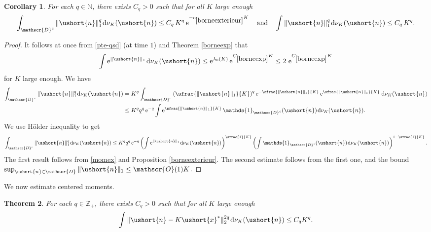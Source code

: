 \documentclass[JEP,XML,SOM,Unicode]{cedram}
\newcommand{\scaleto}[2]{#1}
\let\mathcal\mathscr
\numberwithin{equation}{section}
\theoremstyle{plain}
\newtheorem{theorem}{Theorem}[section]
\newtheorem{corollary}[theorem]{Corollary}
\theoremstyle{definition}
\newcommand{\cte}[1]{C_{\eqref{#1}}}
\newcommand{\pcte}[1]{c_{\eqref{#1}}}
\newcommand{\zentiers}{{\mathbb{Z}}}
\newcommand{\integers}{\mathbb{N}}
\newcommand{\Oun}{\mathcal{O}(1)}
\newcommand{\un}{\mathds{1}}
\newcommand{\vecn}{\ushort{n}}
\newcommand{\vecxf}{\ushort{x}^*}
\newcommand{\nuk}{\nu_{K}}\let\snuk\nuk
\newcommand{\e}{\operatorname{e}}
\newcommand{\dd}{\hspace{1pt}\mathrm{d}}
\newcommand{\norm}[1]{\|#1\|_{1}}\let\snorm\norm
\begin{document}
\begin{corollary}\label{bornepuissance}
For each $q\in\integers$, there exists $C_{q}>0$ such that for all $K$ large enough
\[
\int_{\mathcal{D}^c} \norm{\vecn}^{q}\dd \nuk(\vecn)\le C_{q}\, K^{q} \e^{-\pcte{borneexterieur} K}
\quad
\textup{and}
\quad
\int \norm{\vecn}^{q}\dd\nuk(\vecn)\le C_{q}\, K^{q}.
\]
\end{corollary}
\begin{proof}
It follows at once from \eqref{pte-qsd} (at time $1$) and Theorem \ref{borneexp} that
\begin{equation}\label{momex}
\int \e^{\|\vecn\|_{1}}\!\dd\nuk(\vecn) \le \e^{\lambda_{0}(K)}\e^{\cte{borneexp}K}
\le 2\,\e^{\cte{borneexp}K}
\end{equation}
for $K$ large enough. We have
\begin{align*}
\int_{\mathcal{D}^c} \norm{\vecn}^{q}\dd\nuk(\vecn)
&= K^q \int_{\mathcal{D}^c} \left(\sfrac{\norm{\vecn}}{K}\right)^q \e^{-\sfrac{\scaleto{\|}{5pt}\vecn\scaleto{\|}{5pt}_{1}}{K}}
\e^{\sfrac{\scaleto{\|}{5pt}\vecn\scaleto{\|}{5pt}_{1}}{K}}\dd\nuk(\vecn)\\
& \leq K^q q^q \e^{-q} \int \e^{\sfrac{\|\vecn\|_{1}}{K}} \un_{ \mathcal{D}^c}(\vecn)\dd\nuk(\vecn).
\end{align*}
We use Hölder inequality to get
\[
\int_{ \mathcal{D}^c} \norm{\vecn}^{q}\dd\nuk(\vecn)
\leq
K^q q^q \e^{-q} \left(\int \e^{\|\vecn\|_{1}} \!\dd\nuk(\vecn)\right)^{\sfrac{1}{K}}
\left(\int \un_{ \mathcal{D}^c}(\vecn)\dd\nuk(\vecn)\right)^{1-\sfrac{1}{K}}.
\]
The first result follows from \eqref{momex} and Proposition \ref{borneexterieur}.
The second estimate follows from the first one, and the bound
$\sup_{\vecn \in \mathcal{D}} \norm{\vecn} \leq \Oun K$.
\end{proof}

We now estimate centered moments.
\begin{theorem}\label{bornemom}
For each $q\in\zentiers_{+}$, there exists $C_{q}>0$ such that for all $K$ large enough
\[
\int \|\vecn-K\vecxf \|_{2}^{2\scaleto{q}{5pt}}\dd\nuk(\vecn)\le C_{q} K^{q}.
\]
\end{theorem}
\end{document}

